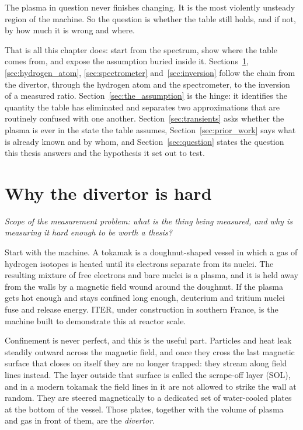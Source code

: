 The plasma in question never finishes changing. It is the most violently
unsteady region of the machine. So the question is whether the table still
holds, and if not, by how much it is wrong and where.

That is all this chapter does: start from the spectrum, show
where the table comes from, and expose the assumption buried inside it.
Sections~\ref{sec:divertor}, \ref{sec:hydrogen_atom}, \ref{sec:spectrometer}
and~\ref{sec:inversion} follow the chain from the divertor, through the hydrogen
atom and the spectrometer, to the inversion of a measured ratio.
Section~\ref{sec:the_assumption} is the hinge: it identifies the quantity the
table has eliminated and separates two approximations that are routinely
confused with one another. Section~\ref{sec:transients} asks whether the plasma
is ever in the state the table assumes, Section~\ref{sec:prior_work} says what
is already known and by whom, and Section~\ref{sec:question} states the question
this thesis answers and the hypothesis it set out to test.

\section{Why the divertor is hard}
\label{sec:divertor}

\emph{Scope of the measurement problem: what is the thing being measured, and why is measuring it
hard enough to be worth a thesis?}

Start with the machine. A tokamak is a doughnut-shaped vessel in which a gas of
hydrogen isotopes is heated until its electrons separate from its nuclei. The
resulting mixture of free electrons and bare nuclei is a plasma, and it is held
away from the walls by a magnetic field wound around the doughnut. If the plasma
gets hot enough and stays confined long enough, deuterium and tritium nuclei fuse
and release energy. ITER, under construction in southern France, is the machine
built to demonstrate this at reactor scale.

Confinement is never perfect, and this is the useful part. Particles and heat
leak steadily outward across the magnetic field, and once they cross the last
magnetic surface that closes on itself they are no longer trapped: they stream
along field lines instead. The layer outside that surface is called the
scrape-off layer (SOL), and in a modern tokamak the field lines in it are not
allowed to strike the wall at random. They are steered magnetically to a
dedicated set of water-cooled plates at the bottom of the vessel. Those plates,
together with the volume of plasma and gas in front of them, are the
\emph{divertor}.

